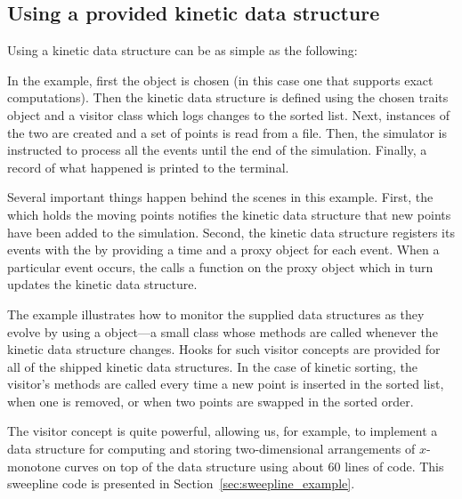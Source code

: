 \subsection{Using a provided kinetic data structure}
\label{sec:sort_example}

Using a kinetic data structure can be as simple as the following:
\label{fig:sort_program}

In the example, first the  object is chosen
(in this case one that supports exact computations). Then the kinetic
data structure is defined using the chosen traits object and a
visitor class which logs changes to the sorted list.  Next, instances
of the two are created and a set of points is read from a file. Then,
the simulator is instructed to process all the events until the end of
the simulation.  Finally, a record of what happened is printed to the
terminal.

Several important things happen behind the scenes in this example.
First, the  which holds the moving
points notifies the kinetic data structure that new points have been
added to the simulation. Second, the
 kinetic data structure registers
its events with the  by providing a time and a
proxy object for each event. When a particular event occurs, the
 calls a function on the proxy object which in turn
updates the kinetic data structure.

The example illustrates how to monitor the supplied data structures as
they evolve by using a  object---a small class whose
methods are called whenever the kinetic data structure changes. Hooks
for such visitor concepts are provided for all of the shipped kinetic
data structures. In the case of kinetic sorting, the visitor's
methods are called every time a new point is inserted in the sorted
list, when one is removed, or when two points are swapped in the
sorted order. 


The visitor concept is quite powerful, allowing us, for example, to
implement a data structure for computing and storing two-dimensional
arrangements of $x$-monotone curves on top of the
 data structure using about 60
lines of code. This sweepline code is presented in
Section~\ref{sec:sweepline_example}.
